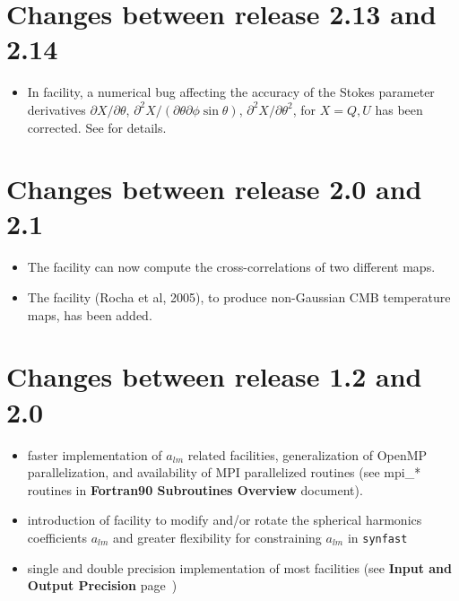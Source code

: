\documentclass[12pt,twoside]{article}
\begin{document}
\newpage

\section[Changes between release 2.13 and 2.14]{Changes between release 2.13 and
2.14}
\begin{itemize}
\item In  facility, a numerical bug affecting the accuracy of the Stokes parameter derivatives 
$\partial X/\partial\theta$, 
$\partial^2 X/(\partial\theta\partial\phi\sin\theta)$, 
$\partial^2 X/\partial \theta^2$, 
for $X=Q,U$ has been corrected. See  for details.
\end{itemize}

\section[Changes between release 2.0 and 2.1]{Changes between release 2.0 and
2.1}
\begin{itemize}
\item The  facility can now compute the cross-correlations of two different
maps. 
\item The  facility (Rocha et al, 2005), to produce non-Gaussian CMB temperature maps,
has been added.
\end{itemize}

\section[Changes between release 1.2 and 2.0]{Changes between release 1.2 and 2.0}
\begin{itemize}
\item faster implementation of $a_{lm}$ related facilities, generalization of
  OpenMP parallelization, and availability of MPI parallelized routines (see
  mpi\_* routines in {\bf Fortran90 Subroutines Overview} document).
\item introduction of  facility to modify and/or rotate the spherical
  harmonics coefficients $a_{lm}$ and greater flexibility for constraining
  $a_{lm}$ in {\tt synfast}
\item single and double precision implementation of most facilities (see {\bf {Input and Output Precision}}
  page~\pageref{page:ioprec})
\end{itemize}
\end{document}
